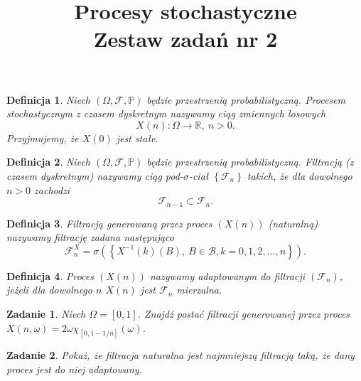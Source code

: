 \documentclass[12pt]{article}
\title{Procesy stochastyczne\\ Zestaw zadań nr 2}
\newtheorem{df}{Definicja}
\newtheorem{zd}{Zadanie}
\begin{document}
\maketitle
\begin{df}
	Niech $\left( \Omega, \mathcal{F}, \mathbb{P}\right)$ będzie przestrzenią probabilistyczną. Procesem stochastycznym z czasem dyskretnym nazywamy ciąg zmiennych losowych	
	\begin{displaymath}
	X(n)\colon \Omega \to \mathbb{R},\ n>0.
	\end{displaymath}
	Przyjmujemy, że $X(0)$ jest stałe.
\end{df}
\begin{df}
	Niech $\left( \Omega, \mathcal{F}, \mathbb{P}\right)$ będzie przestrzenią probabilistyczną. Filtracją (z czasem dyskretnym) nazywamy ciąg pod-$\sigma$-ciał $\left\{\mathcal{F}_n\right\}$ takich, że dla dowolnego $n > 0$ zachodzi
	\begin{displaymath}
	\mathcal{F}_{n-1} \subset \mathcal{F}_n.
	\end{displaymath}
\end{df}
\begin{df}
	Filtracją generowaną przez proces $\left(X(n)\right)$ (naturalną) nazywamy filtrację zadana następująco
	\begin{displaymath}
	\mathcal{F}_n^X = \sigma\left( \left\{ X^{-1}(k)(B),\ B \in \mathcal{B}, k = 0, 1,2, \dots , n \right\}\right).
	\end{displaymath}
\end{df} 
\begin{df}
	Proces $\left(X(n)\right)$ nazywamy adaptowanym do filtracji $\left(\mathcal{F}_n\right)$, jeżeli dla dowolnego $n$ $X(n)$ jest $\mathcal{F}_n$ mierzalna.
\end{df}
\begin{zd}
	Niech $\Omega = [0,1]$. Znajdź postać filtracji generowanej przez proces $X(n,\omega) = 2\omega \chi_{[0, 1 - 1/n]}(\omega)$.
\end{zd}

\begin{zd}
	Pokaż, że filtracja naturalna jest najmniejszą filtracją taką, że dany proces jest do niej adaptowany.
\end{zd}
\end{document}
